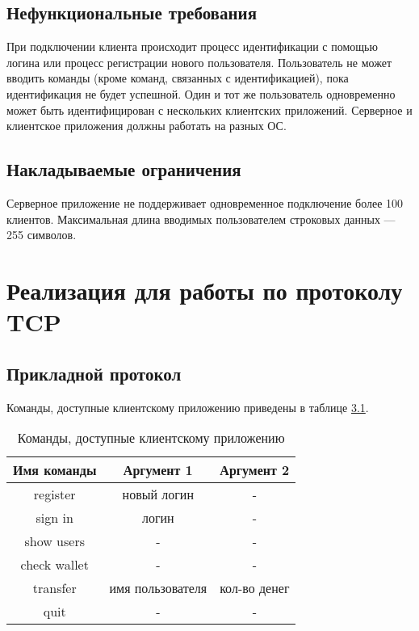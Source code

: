 \documentclass[12pt,a4paper]{report}
\begin{document}
\section{Нефункциональные требования}
При подключении клиента происходит процесс идентификации с помощью логина или процесс регистрации нового пользователя. Пользователь не может вводить команды (кроме команд, связанных с идентификацией), пока идентификация не будет успешной. Один и тот же пользователь одновременно может быть идентифицирован с нескольких клиентских приложений.
Серверное и клиентское приложения должны работать на разных ОС.
\section{Накладываемые ограничения}
Серверное приложение не поддерживает одновременное подключение более 100 клиентов. Максимальная длина вводимых пользователем строковых данных --- 255 символов.
\chapter{Реализация для работы по протоколу TCP}
\section{Прикладной протокол}
\label{protocol_tcp}
Команды, доступные клиентскому приложению приведены в таблице \ref{tab:commands}.
	\begin{table}[h!]
	\center
	\begin{tabular}{|c|c|c|}
	\hline 
	Имя команды & Аргумент 1 & Аргумент 2 \\
	\hline 
	register & новый логин & -  \\ 
	\hline 
	sign in & логин & -  \\ 	
	\hline 
	show users & - & -  \\ 
	\hline 
	check wallet & - & - \\ 
	\hline 
	transfer & имя пользователя & кол-во денег \\ 
	\hline 
	quit & - & - \\ 
	\hline 
	\end{tabular}
	\caption{Команды, доступные клиентскому приложению}
	\label{tab:commands}
	\end{table} 
\end{document}
